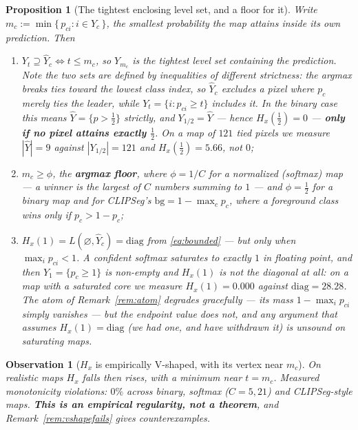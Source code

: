 \documentclass[11pt]{article}
\newtheorem{proposition}{Proposition}
\newtheorem{observation}{Observation}
\theoremstyle{remark}
\newcommand{\Yhat}{\widehat{Y}}
\newcommand{\diag}{\mathrm{diag}}
\begin{document}
\begin{proposition}[The tightest enclosing level set, and a floor for it]\label{prop:floor}
Write $m_c := \min\{\, p_{ci} : i \in \Yhat_c \,\}$, the smallest probability the map
attains inside its own prediction. Then
\begin{enumerate}
\item $Y_t \supseteq \Yhat_c \iff t \le m_c$, so $Y_{m_c}$ is the \emph{tightest} level
set containing the prediction. Note the two sets are defined by inequalities of
\emph{different strictness}: the argmax breaks ties toward the lowest class index, so
$\Yhat_c$ excludes a pixel where $p_c$ merely ties the leader, while
$Y_t = \{i : p_{ci} \ge t\}$ includes it. In the binary case this means
$\Yhat = \{p > \tfrac12\}$ \emph{strictly}, and $Y_{1/2} = \Yhat$ --- hence
$H_x(\tfrac12)=0$ --- \textbf{only if no pixel attains exactly $\tfrac12$}. On a map
of $121$ tied pixels we measure $|\Yhat| = 9$ against $|Y_{1/2}| = 121$ and
$H_x(\tfrac12) = 5.66$, not $0$;
\item $m_c \ge \phi$, the \textbf{argmax floor}, where
$\phi = 1/C$ for a normalized (softmax) map --- a winner is the largest of $C$ numbers
summing to $1$ --- and $\phi = \tfrac12$ for a binary map and for CLIPSeg's
$\mathrm{bg} = 1 - \max_c p_c$, where a foreground class wins only if $p_c > 1-p_c$;
\item $H_x(1) = L(\varnothing,\Yhat_c) = \diag$ from \eqref{eq:bounded} --- \emph{but
only when $\max_i p_{ci} < 1$.} A confident softmax saturates to exactly $1$ in
floating point, and then $Y_1 = \{p_c \ge 1\}$ is \emph{non-empty} and $H_x(1)$ is not
the diagonal at all: on a map with a saturated core we measure $H_x(1) = 0.000$ against
$\diag = 28.28$. The atom of Remark~\ref{rem:atom} degrades gracefully --- its mass
$1-\max_i p_{ci}$ simply vanishes --- but the endpoint value does not, and any argument
that assumes $H_x(1)=\diag$ (we had one, and have withdrawn it) is unsound on
saturating maps.
\end{enumerate}
\end{proposition}

\begin{observation}[$H_x$ is empirically V-shaped, with its vertex near $m_c$]\label{obs:vshape}
On realistic maps $H_x$ falls then rises, with a minimum near $t = m_c$. Measured
monotonicity violations: $0\%$ across binary, softmax ($C=5,21$) and CLIPSeg-style
maps. \textbf{This is an empirical regularity, not a theorem}, and
Remark~\ref{rem:vshapefails} gives counterexamples.
\end{observation}
\end{document}

